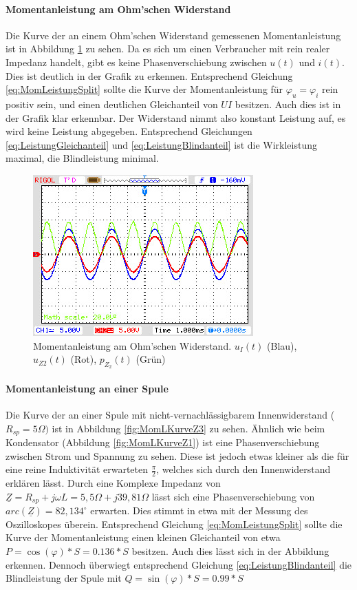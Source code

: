 \paragraph{Momentanleistung am Ohm'schen Widerstand}
Die Kurve der an einem Ohm'schen Widerstand gemessenen Momentanleistung ist in Abbildung \ref{fig:MomLKurveZ2} zu sehen. Da es sich um einen Verbraucher mit rein realer Impedanz handelt, gibt es keine Phasenverschiebung zwischen $u(t)$ und $i(t)$. Dies ist deutlich in der Grafik zu erkennen. Entsprechend Gleichung \eqref{eq:MomLeistungSplit} sollte die Kurve der Momentanleistung für $\varphi_u = \varphi_i$ rein positiv sein, und einen deutlichen Gleichanteil von $UI$ besitzen. Auch dies ist in der Grafik klar erkennbar. Der Widerstand nimmt also konstant Leistung auf, es wird keine Leistung abgegeben. Entsprechend Gleichungen \eqref{eq:LeistungGleichanteil} und \eqref{eq:LeistungBlindanteil} ist die Wirkleistung maximal, die Blindleistung minimal.


\begin{figure}[H]
\centering
\includegraphics[width=0.7\linewidth]{Oszi-Bitmaps/NewFile1.jpg}
\caption{Momentanleistung am Ohm'schen Widerstand. $u_I(t)$ (Blau), $u_{Z2}(t)$ (Rot), $p_{Z_2}(t)$ (Grün)}
\label{fig:MomLKurveZ2}
\end{figure}

\paragraph{Momentanleistung an einer Spule}
Die Kurve der an einer Spule mit nicht-vernachlässigbarem Innenwiderstand ($R_{sp} = 5\Omega)$ ist in Abbildung \ref{fig:MomLKurveZ3} zu sehen. Ähnlich wie beim Kondensator (Abbildung \ref{fig:MomLKurveZ1}) ist eine Phasenverschiebung zwischen Strom und Spannung zu sehen. Diese ist jedoch etwas kleiner als die für eine reine Induktivität erwarteten $\frac{\pi}{2}$, welches sich durch den Innenwiderstand erklären lässt. Durch eine Komplexe Impedanz von $\underline{Z} = R_{sp} + j\omega L = 5,5\Omega + j39,81\Omega$ lässt sich eine Phasenverschiebung von $arc(\underline{Z}) = 82,134^\circ$ erwarten. Dies stimmt in etwa mit der Messung des Oszilloskopes überein. Entsprechend Gleichung \eqref{eq:MomLeistungSplit} sollte die Kurve der Momentanleistung einen kleinen Gleichanteil von etwa $P = \cos(\varphi)*S=0.136*S$ besitzen. Auch dies lässt sich in der Abbildung erkennen. Dennoch überwiegt entsprechend Gleichung \eqref{eq:LeistungBlindanteil} die Blindleistung der Spule mit $Q=\sin(\varphi)*S=0.99*S$

